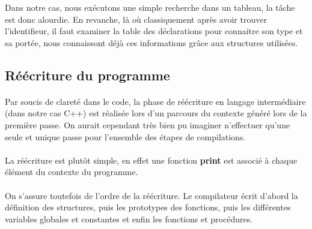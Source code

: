 Dans notre cas, nous exécutons une simple recherche dans un tableau,
la tâche est donc alourdie. En revanche, là où classiquement après avoir 
trouver l'identifieur, il faut examiner la table des déclarations pour 
connaitre son type et sa portée, nous connaissont déjà ces informations grâce 
aux structures utilisées.

\subsection{Réécriture du programme}

\paragraph{}Par soucis de clareté dans le code, la phase de réécriture en 
langage intermédiaire (dans notre cas C++) est réalisée lors d'un parcours 
du contexte généré lors de la première passe. On aurait cependant très bien
pu imaginer n'effectuer qu'une seule et unique passe pour l'ensemble des 
étapes de compilations.

\paragraph{}La réécriture est plutôt simple, en effet une fonction 
\textbf{print} est associé à chaque élément du contexte du programme. 

\paragraph{}On s'assure toutefois de l'ordre de la réécriture. Le compilateur
écrit d'abord la définition des structures, puis les prototypes des fonctions,
puis les différentes variables globales et constantes et enfin les fonctions et 
procédures.

